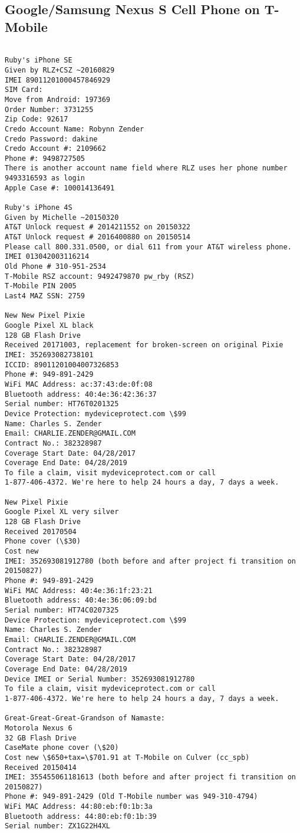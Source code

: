 \documentclass[12pt,twoside]{article}
\begin{document}
\subsection{Google/Samsung Nexus S Cell Phone on T-Mobile}\label{sxn:namaste}
\begin{verbatim}

Ruby's iPhone SE
Given by RLZ+CSZ ~20160829
IMEI 89011201000457846929
SIM Card: 
Move from Android: 197369
Order Number: 3731255
Zip Code: 92617
Credo Account Name: Robynn Zender
Credo Password: dakine
Credo Account #: 2109662
Phone #: 9498727505
There is another account name field where RLZ uses her phone number 9493316593 as login
Apple Case #: 100014136491

Ruby's iPhone 4S
Given by Michelle ~20150320
AT&T Unlock request # 2014211552 on 20150322
AT&T Unlock request # 2016400880 on 20150514
Please call 800.331.0500, or dial 611 from your AT&T wireless phone. 
IMEI 013042003116214
Old Phone # 310-951-2534
T-Mobile RSZ account: 9492479870 pw_rby (RSZ)
T-Mobile PIN 2005
Last4 MAZ SSN: 2759

New New Pixel Pixie
Google Pixel XL black
128 GB Flash Drive
Received 20171003, replacement for broken-screen on original Pixie
IMEI: 352693082738101
ICCID: 89011201004007326853
Phone #: 949-891-2429
WiFi MAC Address: ac:37:43:de:0f:08
Bluetooth address: 40:4e:36:42:36:37
Serial number: HT76T0201325
Device Protection: mydeviceprotect.com \$99
Name: Charles S. Zender
Email: CHARLIE.ZENDER@GMAIL.COM
Contract No.: 382328987
Coverage Start Date: 04/28/2017
Coverage End Date: 04/28/2019
To file a claim, visit mydeviceprotect.com or call
1-877-406-4372. We're here to help 24 hours a day, 7 days a week.

New Pixel Pixie
Google Pixel XL very silver
128 GB Flash Drive
Received 20170504
Phone cover (\$30)
Cost new 
IMEI: 352693081912780 (both before and after project fi transition on 20150827)
Phone #: 949-891-2429
WiFi MAC Address: 40:4e:36:1f:23:21
Bluetooth address: 40:4e:36:06:09:bd
Serial number: HT74C0207325
Device Protection: mydeviceprotect.com \$99
Name: Charles S. Zender
Email: CHARLIE.ZENDER@GMAIL.COM
Contract No.: 382328987
Coverage Start Date: 04/28/2017
Coverage End Date: 04/28/2019
Device IMEI or Serial Number: 352693081912780
To file a claim, visit mydeviceprotect.com or call
1-877-406-4372. We're here to help 24 hours a day, 7 days a week.

Great-Great-Great-Grandson of Namaste:
Motorola Nexus 6
32 GB Flash Drive
CaseMate phone cover (\$20)
Cost new \$650+tax=\$701.91 at T-Mobile on Culver (cc_spb)
Received 20150414
IMEI: 355455061181613 (both before and after project fi transition on 20150827)
Phone #: 949-891-2429 (Old T-Mobile number was 949-310-4794)
WiFi MAC Address: 44:80:eb:f0:1b:3a
Bluetooth address: 44:80:eb:f0:1b:39
Serial number: ZX1G22H4XL


\end{verbatim}
\end{document}
